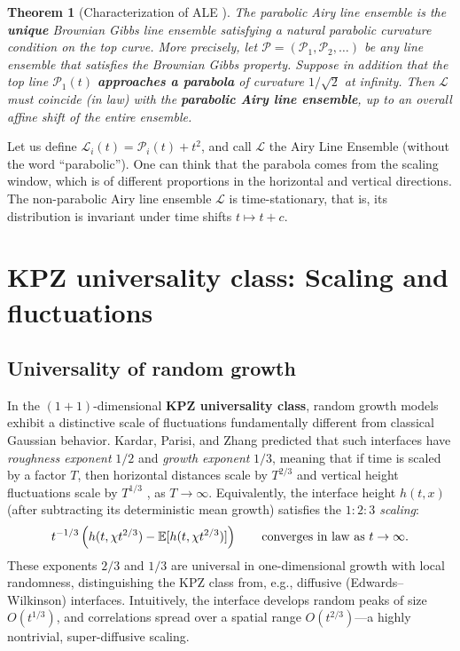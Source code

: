 \documentclass[letterpaper,11pt,oneside,reqno]{article}
\numberwithin{equation}{section}
\newtheorem{theorem}[proposition]{Theorem}
\theoremstyle{definition}
\begin{document}
\begin{theorem}[Characterization of ALE \cite{AggarwalHuang2023Characterization}]
	The parabolic Airy line ensemble is the \textbf{unique}
	Brownian Gibbs line ensemble satisfying a natural
	parabolic curvature condition on the top curve. More
	precisely, let
	$\boldsymbol{\mathcal{P}}=(\mathcal{P}_1,\mathcal{P}_2,\ldots)$
	be any line ensemble that satisfies the Brownian Gibbs
	property. Suppose in addition that the top line
	$\mathcal{P}_1(t)$ \textbf{approaches a parabola} of
	curvature $1/\sqrt{2}$ at infinity. Then
	$\boldsymbol{\mathcal{L}}$ must coincide (in law) with the
	\textbf{parabolic Airy line ensemble}, up to an overall
	affine shift of the entire ensemble.
\end{theorem}

Let us define $\mathcal{L}_i(t)=\mathcal{P}_i(t)+t^2$, and
call $\mathcal{L}$ the Airy Line Ensemble
(without the word ``parabolic''). One can think that the parabola comes
from the scaling window, which is of different proportions
in the horizontal and vertical directions.
The non-parabolic
Airy line ensemble $\mathcal{L}$ is time-stationary,
that is, its distribution is invariant under time shifts $t\mapsto t+c$.

\section{KPZ universality class: Scaling and fluctuations}

\subsection{Universality of random growth}

In the $(1+1)$-dimensional \textbf{KPZ universality class},
random growth models exhibit a distinctive scale of
fluctuations fundamentally different from classical Gaussian
behavior. Kardar, Parisi, and Zhang \cite{KPZ1986} predicted
that such interfaces have \emph{roughness exponent} $1/2$
and \emph{growth exponent} $1/3$, meaning that if time is
scaled by a factor $T$, then horizontal distances scale by
$T^{2/3}$ and vertical height fluctuations scale by
$T^{1/3}$ \cite{remenik2023integrable}, as $T\to\infty$.
Equivalently, the interface height $h(t,x)$ (after subtracting its deterministic mean growth) satisfies the \emph{$1:2:3$ scaling}:
\[ t^{-1/3}\left(
h(t,\chi t^{2/3})-\mathbb{E}[h(t, \chi t^{2/3})]
\right)\qquad \textnormal{converges in law as } t\to\infty.
\]
These exponents $2/3$ and $1/3$ are universal in
one-dimensional growth with local randomness, distinguishing
the KPZ class from, e.g., diffusive (Edwards–Wilkinson)
interfaces. Intuitively, the interface develops random peaks
of size $O(t^{1/3})$, and correlations spread over a spatial
range $O(t^{2/3})$—a highly nontrivial, super-diffusive
scaling.
\end{document}
